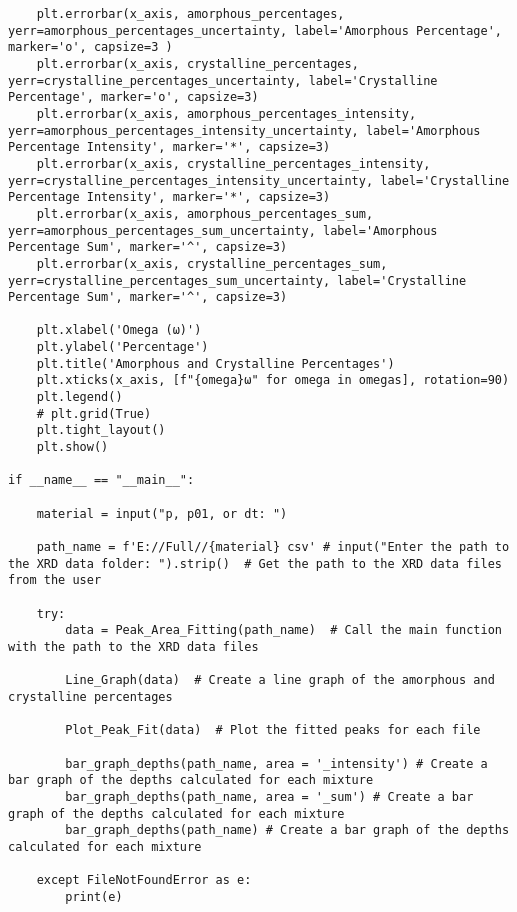 \begin{small}
\begin{verbatim}
    plt.errorbar(x_axis, amorphous_percentages, yerr=amorphous_percentages_uncertainty, label='Amorphous Percentage', marker='o', capsize=3 )
    plt.errorbar(x_axis, crystalline_percentages, yerr=crystalline_percentages_uncertainty, label='Crystalline Percentage', marker='o', capsize=3)
    plt.errorbar(x_axis, amorphous_percentages_intensity, yerr=amorphous_percentages_intensity_uncertainty, label='Amorphous Percentage Intensity', marker='*', capsize=3)
    plt.errorbar(x_axis, crystalline_percentages_intensity, yerr=crystalline_percentages_intensity_uncertainty, label='Crystalline Percentage Intensity', marker='*', capsize=3)
    plt.errorbar(x_axis, amorphous_percentages_sum, yerr=amorphous_percentages_sum_uncertainty, label='Amorphous Percentage Sum', marker='^', capsize=3)
    plt.errorbar(x_axis, crystalline_percentages_sum, yerr=crystalline_percentages_sum_uncertainty, label='Crystalline Percentage Sum', marker='^', capsize=3)

    plt.xlabel('Omega (ω)')
    plt.ylabel('Percentage')
    plt.title('Amorphous and Crystalline Percentages')
    plt.xticks(x_axis, [f"{omega}ω" for omega in omegas], rotation=90)
    plt.legend()
    # plt.grid(True)
    plt.tight_layout()
    plt.show()

if __name__ == "__main__":

    material = input("p, p01, or dt: ")

    path_name = f'E://Full//{material} csv' # input("Enter the path to the XRD data folder: ").strip()  # Get the path to the XRD data files from the user

    try:
        data = Peak_Area_Fitting(path_name)  # Call the main function with the path to the XRD data files

        Line_Graph(data)  # Create a line graph of the amorphous and crystalline percentages

        Plot_Peak_Fit(data)  # Plot the fitted peaks for each file

        bar_graph_depths(path_name, area = '_intensity') # Create a bar graph of the depths calculated for each mixture
        bar_graph_depths(path_name, area = '_sum') # Create a bar graph of the depths calculated for each mixture
        bar_graph_depths(path_name) # Create a bar graph of the depths calculated for each mixture
    
    except FileNotFoundError as e:
        print(e)
        \end{verbatim}
    \endgroup
\end{small}
